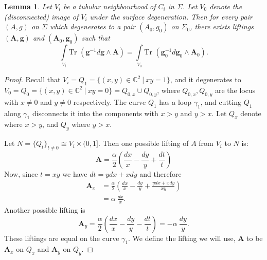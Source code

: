 \documentclass[]{article}
\newtheorem{lemma}{Lemma}
\newcommand{\bg}{\mathbf{g}}
\newcommand{\bA}{\mathbf{A}}
\newcommand{\Tr}{\text{Tr }}
\begin{document}
	\begin{lemma}
		Let $V_i$ be a tubular neighbourhood of $C_i$ in $\Sigma$. Let $V_{0}$ denote the (disconnected) image of $V_i$ under the surface degeneration. Then for every pair $(A,g)$ on $\Sigma$ which degenerates to a pair $(A_0, g_0)$ on $\Sigma_0$, there exists liftings $(\bA,\bg)$ and $(\bA_0,\bg_0)$ such that
		\begin{equation}
			\int\limits_{V_i} \Tr(\bg^{-1}d\bg\wedge \bA) = \int\limits_{V_0} \Tr(\bg_0^{-1}d\bg_0\wedge \bA_0).
		\end{equation}
		\label{l:main-lemma}
	\end{lemma}
	\begin{proof}
		Recall that $V_i=Q_1 = \{(x,y)\in \mathbb{C}^2~|~ xy=1\}$, and it degenerates to $V_0 = Q_0 = \{(x,y)\in\mathbb{C}^2~|~xy=0\} = Q_{0,x} \cup Q_{0,y}$, where $Q_{0,x},Q_{0,y}$ are the locus with $x\neq0$ and $y\neq 0$ respectively. The curve $Q_1$ has a loop $\gamma_1$, and cutting $Q_1$ along $\gamma_1$ disconnects it into the components with $x>y$ and $y>x$. Let $Q_x$ denote where $x>y$, and $Q_y$ where $y>x$.
		
		Let $N=\{Q_t\}_{t\neq 0}\cong V_i\times(0,1]$. Then one possible lifting of $A$ from $V_i$ to $N$ is:
		\begin{equation}
			\bA = \frac{\alpha}{2}\left(\frac{dx}{x}-\frac{dy}{y} + \frac{dt}{t}\right)
		\end{equation}
		Now, since $t=xy$ we have $dt =ydx+xdy$ and therefore
		\begin{align*}
			\bA_x &= \frac{\alpha}{2}\left(\frac{dx}{x}-\frac{dy}{y} + \frac{ydx+xdy}{xy}\right)\\
			&= \alpha~ \frac{dx}{x}.
		\end{align*}
		Another possible lifting is 
		\begin{equation}
			\bA_y = \frac{\alpha}{2}\left(\frac{dx}{x}-\frac{dy}{y} -  \frac{dt}{t}\right) = -\alpha~\frac{dy}{y}.
		\end{equation}
		These liftings are equal on the curve $\gamma_1$. We define the lifting we will use, $\bA$ to be $\bA_x$ on $Q_x$ and $\bA_y$ on $Q_y$.
		

\end{proof}
\end{document}
